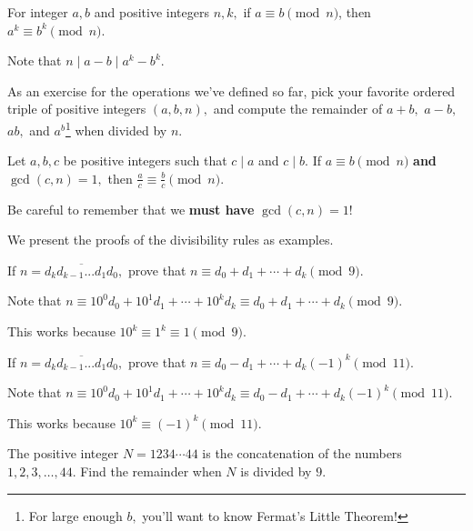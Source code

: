 \documentclass[mast]{lucky}
\begin{document}
\begin{fact}[Exponentiating]
For integer $a,b$ and positive integers $n,k,$ if $a \equiv b\pmod{n}$, then $a^k \equiv b^k \pmod{n}$.
\end{fact}

\begin{pro}
Note that $n\mid a-b\mid a^k-b^k.$
\end{pro}

As an exercise for the operations we've defined so far, pick your favorite ordered triple of positive integers $(a,b,n),$ and compute the remainder of $a+b,$ $a-b,$ $ab,$ and $a^b$\footnote{For large enough $b,$ you'll want to know Fermat's Little Theorem!} when divided by $n.$

\begin{fact}[Dividing]
Let $a,b,c$ be positive integers such that $c\mid a$ and $c\mid b.$ If $a\equiv b\pmod{n}$ \textbf{and} $\gcd(c,n)=1,$ then $\frac{a}{c}\equiv\frac{b}{c}\pmod{n}.$
\end{fact}

Be careful to remember that we \textbf{must have} $\gcd(c,n)=1$!

We present the proofs of the divisibility rules as examples.

\begin{exam}
If $n=\overline{d_{k}d_{k-1}...d_{1}d_{0}},$ prove that $n\equiv d_0+d_1+\cdots+d_{k}\pmod{9}.$
\end{exam}

\begin{sol}
Note that $n\equiv 10^0d_0+10^1d_1+\cdots+10^{k}d_{k}\equiv d_0+d_1+\cdots+d_k\pmod{9}.$

This works because $10^k\equiv 1^k\equiv 1\pmod{9}.$
\end{sol}

\begin{exam}
If $n=\overline{d_{k}d_{k-1}...d_{1}d_{0}},$ prove that $n\equiv d_0-d_1+\cdots+d_{k}(-1)^k\pmod{11}.$
\end{exam}

\begin{sol}
Note that $n\equiv 10^0d_0+10^1d_1+\cdots+10^{k}d_{k}\equiv d_0-d_1+\cdots+d_k(-1)^k\pmod{11}.$

This works because $10^k\equiv (-1)^k\pmod{11}.$
\end{sol}

\begin{exam}
The positive integer $N=1234\cdots44$ is the concatenation of the numbers $1,2,3,\ldots,44.$ Find the remainder when $N$ is divided by $9.$
\end{exam}
\end{document}
